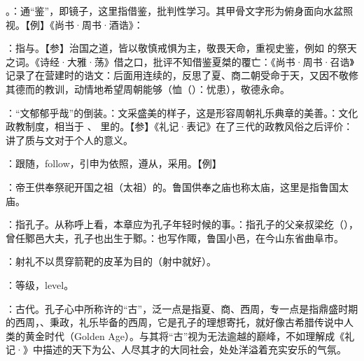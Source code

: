 {
\item {}。：通“鉴”，即镜子，这里指借鉴，批判性学习。其甲骨文字形为俯身面向水盆照视。【例】《尚书·周书·酒诰》：

：指与。【参】治国之道，皆以敬慎戒惧为主，敬畏天命，重视史鉴，例如  的祭天之词。《诗经·大雅·荡》借之口，批评不知借鉴夏桀的覆亡：《尚书·周书·召诰》记录了在营建时的诰文：后面用连续的，反思了夏、商二朝受命于天，又因不敬修其德而的教训，动情地希望周朝能够（恤（）：忧患），敬德永命。
\item {}：“文郁郁乎哉”的倒装。：文采盛美的样子，这是形容周朝礼乐典章的美善。：文化政教制度，相当于 、 里的。【参】《礼记·表记》在了三代的政教风俗之后评价：  讲了质与文对于个人的意义。

\item {}：跟随，follow，引申为依照，遵从，采用。【例】 
}
{}


{
\item {}：帝王供奉祭祀开国之祖（太祖）的。鲁国供奉之庙也称太庙，这里是指鲁国太庙。
\item {}：指孔子。从称呼上看，本章应为孔子年轻时候的事。：指孔子的父亲叔梁纥（），曾任鄹邑大夫，孔子也出生于鄹。：也写作陬，鲁国小邑，在今山东省曲阜市。
}
{}


{
\item {}：射礼不以贯穿箭靶的皮革为目的（射中就好）。
\item {}：等级，level。

\item {}：古代。孔子心中所称许的“古”，泛一点是指夏、商、西周，专一点是指鼎盛时期的西周，、秉政，礼乐毕备的西周，它是孔子的理想寄托，就好像古希腊传说中人类的黄金时代（Golden Age）。与其将“古”视为无法逾越的巅峰，不如理解成《礼记·》中描述的天下为公、人尽其才的大同社会，处处洋溢着充实安乐的气氛。
}
{}  %


